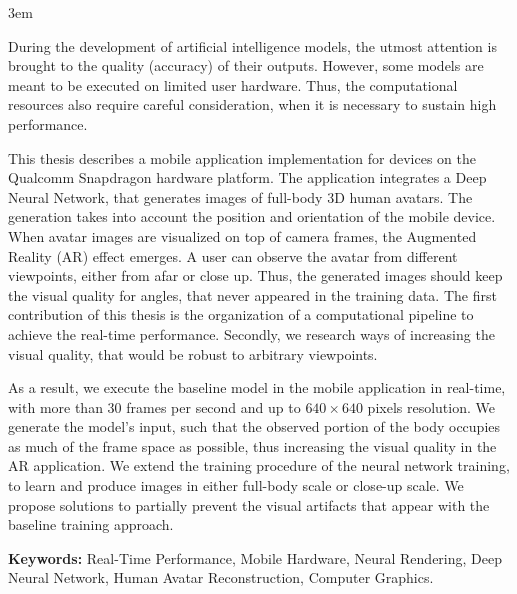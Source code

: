 \emergencystretch 3em

\par
During the development of artificial intelligence models, the utmost attention is brought to the quality (accuracy) of their outputs. However, some models are meant to be executed on limited user hardware. Thus, the computational resources also require careful consideration, when it is necessary to sustain high performance.

\par
This thesis describes a mobile application implementation for devices on the Qualcomm Snapdragon hardware platform. The application integrates a Deep Neural Network, that generates images of full-body 3D human avatars. The generation takes into account the position and orientation of the mobile device. When avatar images are visualized on top of camera frames, the Augmented Reality (AR) effect emerges. A user can observe the avatar from different viewpoints, either from afar or close up. Thus, the generated images should keep the visual quality for angles, that never appeared in the training data. The first contribution of this thesis is the organization of a computational pipeline to achieve the real-time performance. Secondly, we research ways of increasing the visual quality, that would be robust to arbitrary viewpoints.

\par
As a result, we execute the baseline model \cite{dnn:stylepeople21} in the mobile application in real-time, with more than 30 frames per second and up to $640\times640$ pixels resolution. We generate the model's input, such that the observed portion of the body occupies as much of the frame space as possible, thus increasing  the visual quality in the AR application. We extend the training procedure of the neural network training, to learn and produce images in either full-body scale or close-up scale. We propose solutions to partially prevent the visual artifacts that appear with the baseline training approach. 

\par
\textbf{Keywords:} Real-Time Performance, Mobile Hardware, Neural Rendering, Deep Neural Network, Human Avatar Reconstruction, Computer Graphics.  
